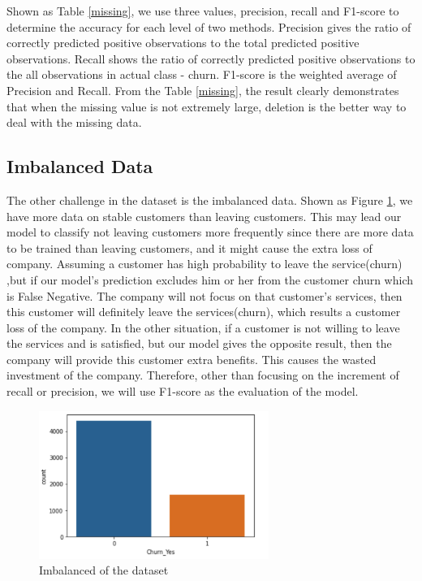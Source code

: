 \documentclass{article}
\begin{document}
\noindent Shown as Table \ref{missing}, we use three values, precision, recall and F1-score to determine the accuracy for each level of two methods. Precision gives the ratio of correctly predicted positive observations to the total predicted positive observations. Recall shows the ratio of correctly predicted positive observations to the all observations in actual class - churn. F1-score is the weighted average of Precision and Recall. From the Table \ref{missing}, the result clearly demonstrates that when the missing value is not extremely large, deletion is the better way to deal with the missing data.
\subsection{Imbalanced Data}
The other challenge in the dataset is the imbalanced data. Shown as Figure \ref{fig:imbalanced}, we have more data on stable customers than leaving customers. This may lead our model to classify not leaving customers more frequently since there are more data to be trained than leaving customers, and it might cause the extra loss of company. Assuming a customer has high probability to leave the service(churn) ,but if our model's prediction excludes him or her from the customer churn which is False Negative. The company will not focus on that customer's services, then this customer will definitely leave the services(churn), which results a customer loss of the company. In the other situation, if a customer is not willing to leave the services and is satisfied, but our model gives the opposite result, then the company will provide this customer extra benefits. This causes the wasted investment of the company. Therefore, other than focusing on the increment of recall or precision, we will use F1-score as the evaluation of the model.
\FloatBarrier
\begin{figure}[htb]
    \centering
    \includegraphics[width=7.5cm]{imbalanced}
    \caption{Imbalanced of the dataset}
    \label{fig:imbalanced}
\end{figure}
\FloatBarrier
\end{document}
